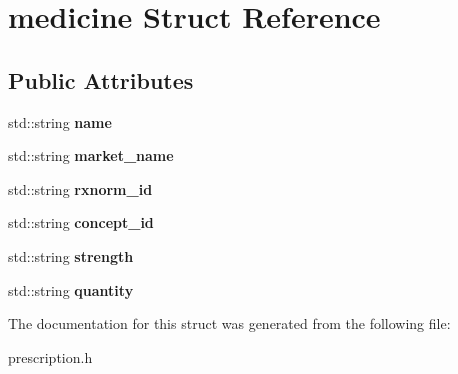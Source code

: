 \hypertarget{structmedicine}{\section{medicine Struct Reference}
\label{d3/d07/structmedicine}
}
\subsection*{Public Attributes}
\begin{DoxyCompactItemize}
\item 
\hypertarget{structmedicine_acd4f4546c02656c5849c7f39f7660acc}{std\-::string {\bfseries name}}\label{d3/d07/structmedicine_acd4f4546c02656c5849c7f39f7660acc}

\item 
\hypertarget{structmedicine_ade31a1a6210f4f7e2b37832a35593c0c}{std\-::string {\bfseries market\-\_\-name}}\label{d3/d07/structmedicine_ade31a1a6210f4f7e2b37832a35593c0c}

\item 
\hypertarget{structmedicine_a503c1beb4a3c6fa53cc59b565f447e20}{std\-::string {\bfseries rxnorm\-\_\-id}}\label{d3/d07/structmedicine_a503c1beb4a3c6fa53cc59b565f447e20}

\item 
\hypertarget{structmedicine_a5b32c9cab1b2ae4406a46f3dd5f152b8}{std\-::string {\bfseries concept\-\_\-id}}\label{d3/d07/structmedicine_a5b32c9cab1b2ae4406a46f3dd5f152b8}

\item 
\hypertarget{structmedicine_ac9f661459d431ae0eadf430fa00f941d}{std\-::string {\bfseries strength}}\label{d3/d07/structmedicine_ac9f661459d431ae0eadf430fa00f941d}

\item 
\hypertarget{structmedicine_a7241be98632597337542dba7c772687c}{std\-::string {\bfseries quantity}}\label{d3/d07/structmedicine_a7241be98632597337542dba7c772687c}

\end{DoxyCompactItemize}


The documentation for this struct was generated from the following file\-:\begin{DoxyCompactItemize}
\item 
prescription.\-h\end{DoxyCompactItemize}
